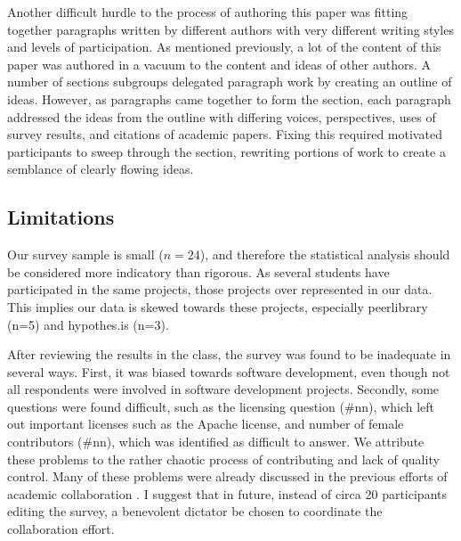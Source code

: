 
Another difficult hurdle to the process of authoring this paper was fitting together paragraphs written by different authors with very different writing styles and levels of participation. As mentioned previously, a lot of the content of this paper was authored in a vacuum to the content and ideas of other authors. A number of sections subgroups delegated paragraph work by creating an outline of ideas. However, as paragraphs came together to form the section, each paragraph addressed the ideas from the outline with differing voices, perspectives, uses of survey results, and citations of academic papers. Fixing this required motivated participants to sweep through the section, rewriting portions of work to create a semblance of clearly flowing ideas.

\subsection{Limitations}
\label{sec:limitations}

Our survey sample is small ($n=24$), and therefore the statistical analysis should be considered more indicatory than rigorous. As several students have participated in the same projects, those projects over represented in our data. This implies our data is skewed towards these projects, especially peerlibrary (n=5) and hypothes.is (n=3).

After reviewing the results in the class, the survey was found to be inadequate in several ways. First, it was biased towards software development, even though not all respondents were involved in software development projects. Secondly, some questions were found difficult, such as the licensing question (\#nn), which left out important licenses such as the Apache license, and number of female contributors (\#nn), which was identified as difficult to answer. We attribute these problems to the rather chaotic process of contributing and lack of quality control.  Many of these problems were already discussed in the previous efforts of academic collaboration \cite{Tomlinson2012}. I suggest that in future, instead of circa 20 participants editing the survey, a benevolent dictator be chosen to coordinate the collaboration effort.


